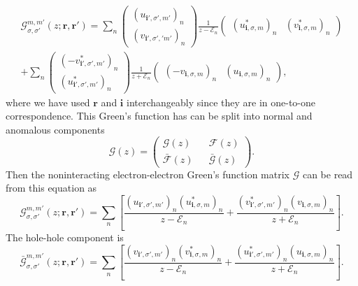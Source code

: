 \begin{multline}
\bm{\mathcal{G}}_{\sigma,\sigma'}^{m,m'}\left(z;\mathbf{r},\mathbf{r}'\right)
=
\sum_n
\begin{pmatrix}
(u_{\mathbf{i}',\sigma',m'})_n\\
(v_{\mathbf{i}',\sigma','m'})_n
\end{pmatrix}
\frac{1}{z-\mathcal{E}_n}
\begin{pmatrix}
(u^*_{\mathbf{i},\sigma,m})_n&
(v^*_{\mathbf{i},\sigma,m})_n
\end{pmatrix}
\\+
\sum_n
\begin{pmatrix}
(-v^*_{\mathbf{i}',\sigma',m'})_n\\
(u^*_{\mathbf{i}',\sigma',m'})_n
\end{pmatrix}
\frac{1}{z+\mathcal{E}_n}
\begin{pmatrix}
(-v_{\mathbf{i},\sigma,m})_n&
(u_{\mathbf{i},\sigma,m})_n
\end{pmatrix},
\label{eq:Nambu-Gorkov_Green_function}
\end{multline}
where we have used ${\mathbf r}$ and ${\mathbf i}$ interchangeably since they are in one-to-one correspondence.
This Green's function has can be split into normal and anomalous components
\begin{equation}
\bm{\mathcal{G}}\left(z \right) 
=
\begin{pmatrix}
\mathcal{G}\left(z \right) &&
\mathcal{F}\left(z \right)  \\
\bar{\mathcal{F}}\left(z \right) 
&&
\bar{\mathcal{G}}\left(z \right) 
\end{pmatrix}.
\end{equation}
Then the noninteracting electron-electron Green's function matrix $\mathcal{G}$ can be read from this equation as
\begin{equation}
\mathcal{G}_{\sigma,\sigma'}^{m,m'}\left(z;\mathbf{r},\mathbf{r}'\right)
=
\sum_n
\left[
\frac{
(u_{\mathbf{i}',\sigma',m'})_n
(u^*_{\mathbf{i},\sigma,m})_n
}{z-\mathcal{E}_n}
+
\frac{
(v^*_{\mathbf{i}',\sigma',m'})_n
(v_{\mathbf{i},\sigma,m})_n
}{z+\mathcal{E}_n}
\right].
\end{equation}
The hole-hole component is
\begin{equation}
\bar{\mathcal{G}}_{\sigma,\sigma'}^{m,m'}\left(z;\mathbf{r},\mathbf{r}'\right)
=
\sum_n
\left[
\frac{
(v_{\mathbf{i}',\sigma',m'})_n
(v^*_{\mathbf{i},\sigma,m})_n
}{z-\mathcal{E}_n}
+
\frac{
(u^*_{\mathbf{i}',\sigma',m'})_n
(u_{\mathbf{i},\sigma,m})_n
}{z+\mathcal{E}_n}
\right].
\end{equation}
